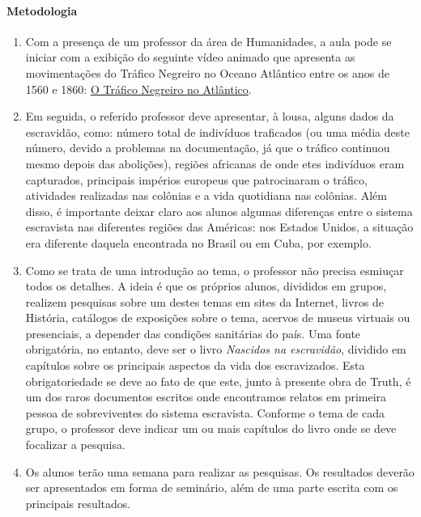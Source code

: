 \documentclass[11pt]{extarticle}
\begin{document}
\paragraph{Metodologia}

   \begin{enumerate}
    \item
    Com a presença de um professor da área de Humanidades, a aula pode se iniciar 
    com a exibição do seguinte vídeo animado
    que apresenta as movimentações do Tráfico Negreiro no Oceano Atlântico
    entre os anos de 1560 e 1860:
    \href{https://www.youtube.com/watch?v=aMyg2Cmukmo}{O Tráfico Negreiro no Atlântico}.

    \item
    Em seguida, o referido professor deve apresentar, à lousa, alguns dados da escravidão,
    como: número total de indivíduos traficados (ou uma média deste número, devido a problemas
    na documentação, já que o tráfico continuou mesmo depois das abolições), regiões africanas
    de onde etes indivíduos eram capturados, principais impérios europeus que patrocinaram
    o tráfico, atividades realizadas nas colônias e a vida quotidiana nas colônias. Além disso, 
    é importante deixar claro aos alunos algumas diferenças entre o sistema escravista
    nas diferentes regiões das Américas: nos Estados Unidos, a situação era diferente daquela
    encontrada no Brasil ou em Cuba, por exemplo. 

    \item
    Como se trata de uma introdução ao tema, o professor não precisa esmiuçar todos os detalhes.
    A ideia é que os próprios alunos, divididos em grupos, realizem pesquisas sobre um destes
    temas em sites da Internet, livros de História, catálogos de exposições sobre o tema,
    acervos de museus virtuais ou presenciais, a depender das condições sanitárias do país. 
    Uma fonte obrigatória, no entanto, deve ser o livro \emph{Nascidos na escravidão}, dividido
    em capítulos sobre os principais aspectos da vida dos escravizados. Esta obrigatoriedade
    se deve ao fato de que este, junto à presente obra de Truth, é um dos raros
    documentos escritos onde encontramos relatos em primeira pessoa de 
    sobreviventes do sistema escravista. Conforme o tema de cada grupo, o professor deve
    indicar um ou mais capítulos do livro onde se deve focalizar a pesquisa.

    \item
    Os alunos terão uma semana para realizar as pesquisas. Os resultados deverão ser apresentados 
    em forma de seminário, além de uma parte escrita com os principais resultados.

   \end{enumerate}
\end{document}
